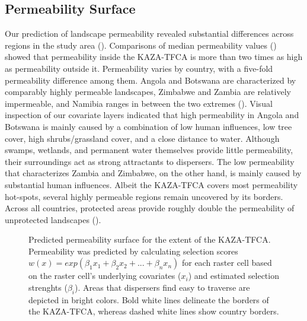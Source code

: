 \documentclass[abstract=on,10pt,a4paper,bibliography=totocnumbered]{article}
\begin{document}
\subsection{Permeability Surface}
Our prediction of landscape permeability revealed substantial differences across
regions in the study area (). Comparisons of median
permeability values () showed that permeability inside
the KAZA-TFCA is more than two times as high as permeability outside it.
Permeability varies by country, with a five-fold permeability difference among
them. Angola and Botswana are characterized by comparably highly permeable
landscapes, Zimbabwe and Zambia are relatively impermeable, and Namibia ranges
in between the two extremes (). Visual inspection of our
covariate layers indicated that high permeability in Angola and Botswana is
mainly caused by a combination of low human influences, low tree cover, high
shrubs/grassland cover, and a close distance to water. Although swamps,
wetlands, and permanent water themselves provide little permeability, their
surroundings act as strong attractants to dispersers. The low permeability that
characterizes Zambia and Zimbabwe, on the other hand, is mainly caused by
substantial human influences. Albeit the KAZA-TFCA covers most permeability
hot-spots, several highly permeable regions remain uncovered by its borders.
Across all countries, protected areas provide roughly double the permeability of
unprotected landscapes ().

\begin{figure}[hbtp]
  \begin{center}
    \caption{Predicted permeability surface for the extent of the KAZA-TFCA.
    Permeability was predicted by calculating selection scores \(w(x) =
    exp(\beta_1 x_1 + \beta_2 x_2 + ... + \beta_n x_n)\) for each raster cell
    based on the raster cell's underlying covariates (\(x_i\)) and estimated
    selection strenghts (\(\beta_i\)). Areas that dispersers find easy to
    traverse are depicted in bright colors. Bold white lines delineate the
    borders of the KAZA-TFCA, whereas dashed white lines show country borders.}
    \label{PermeabilityMap}
  \end{center}
\end{figure}
\end{document}
